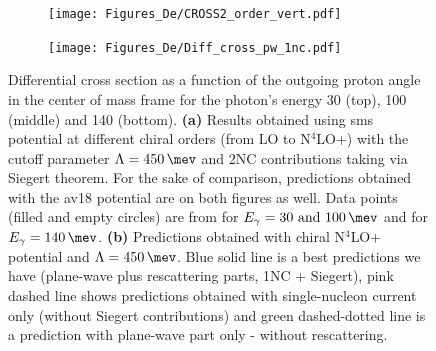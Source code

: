     \begin{figure}[h]
        \centering
        \begin{subfigure}[t]{0.46\textwidth}
            \texttt{[image: Figures\_De/CROSS2\_order\_vert.pdf]}
            \caption{}
            \label{Diff_cross_order}
        \end{subfigure}
        \begin{subfigure}[t]{0.46\textwidth}
            \texttt{[image: Figures\_De/Diff\_cross\_pw\_1nc.pdf]}
            \caption{}
            \label{Diff_cross_pw_1nc}
        \end{subfigure}
        \caption{Differential cross section as a function of the outgoing proton angle in the center of mass frame 
        for the photon's energy \SI{30}{\mev} (top), \SI{100}{\mev} (middle) and \SI{140}{\mev} (bottom).
        {\bf (a)} Results obtained using \gls*{sms} potential
        at different chiral orders (from LO to N$^4$LO+) with the cutoff parameter $\Lambda=\SI{450}{\mev}$ and 
        2NC contributions taking via Siegert theorem.
        For the sake of comparison, predictions obtained with the \gls*{av18} potential are on both figures as well.
        Data points (filled and empty circles) are from \cite{Ying_Experiment_Deut}
        for $E_\gamma=\SIlist[list-units = single]{30; 100}{\mev}$
        and \cite{DeSanctis_Experiment_Deut} for $E_\gamma=\SI{140}{\mev}$.
        {\bf (b)} Predictions obtained with chiral N$^4$LO+ potential and $\Lambda=\SI{450}{\mev}$.
        Blue solid line is a best predictions we have (plane-wave plus rescattering parts, 1NC + Siegert), pink dashed line shows predictions obtained with
        single-nucleon current only (without Siegert contributions) and green dashed-dotted line
        is a prediction with plane-wave part only - without rescattering.
        }
        \label{Diff_cross_order_pw}
    \end{figure}


